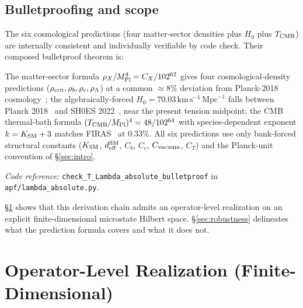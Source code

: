 \documentclass[11pt]{article}
\newcommand{\coderef}[2]{\smallskip\noindent\textit{Code reference:} \texttt{#1} in \texttt{#2}.}
\newcommand{\Mpl}{M_{\rm Pl}}
\begin{document}
\subsection{Bulletproofing and scope}\label{sec:cosmology_bulletproof}

The six cosmological predictions (four matter-sector densities plus $H_0$ plus $T_{\rm CMB}$) are internally consistent and individually verifiable by code check. Their composed bulletproof theorem is:

\begin{tcolorbox}[apfbox, title={Theorem T\_Lambda\_absolute\_bulletproof}]
The matter-sector formula $\rho_X/\Mpl^4 = C_X/102^{62}$ gives four cosmological-density predictions ($\rho_{\rm crit}, \rho_b, \rho_c, \rho_\Lambda$) at a common $\approx 8\%$ deviation from Planck-2018 cosmology~\cite{Planck2018}; the algebraically-forced $H_0 = 70.03\,\mathrm{km}\,\mathrm{s}^{-1}\,\mathrm{Mpc}^{-1}$ falls between Planck 2018~\cite{Planck2018} and SH0ES 2022~\cite{Riess2022}, near the present tension midpoint; the CMB thermal-bath formula $(T_{\rm CMB}/\Mpl)^4 = 48/102^{64}$ with species-dependent exponent $k = K_{\rm SM} + 3$ matches FIRAS~\cite{Fixsen2009} at 0.33\%. All six predictions use only bank-forced structural constants ($K_{\rm SM}$, $d_{\rm eff}^{\rm SM}$, $C_b$, $C_c$, $C_{\rm vacuum}$, $C_T$) and the Planck-unit convention of \S\ref{sec:intro}.
\end{tcolorbox}

\coderef{check\_T\_Lambda\_absolute\_bulletproof}{apf/lambda\_absolute.py}

\smallskip

\S\ref{sec:operator_level} shows that this derivation chain admits an operator-level realization on an explicit finite-dimensional microstate Hilbert space. \S\ref{sec:robustness} delineates what the prediction formula covers and what it does not.

\section{Operator-Level Realization (Finite-Dimensional)}\label{sec:operator_level}
\end{document}
